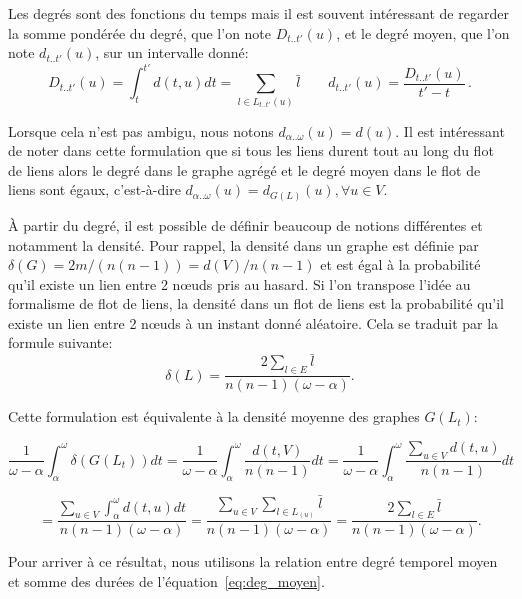 Les degrés sont des fonctions du temps mais il est souvent intéressant de regarder la somme pondérée du degré, que l'on note $D_{t..t'}(u)$, et le degré moyen, que l'on note $d_{t..t'}(u)$, sur un intervalle donné:
\begin{equation}
D_{t..t'}(u)= \int_{t}^{t'}d(t,u) dt  = \sum_{l \in L_{t..t'}(u)}\bar{l} \qquad
d_{t..t'}(u)= \dfrac{D_{t..t'}(u)}{t'-t}\, .
\label{eq:deg_moyen}
\end{equation}

Lorsque cela n'est pas ambigu, nous notons $d_{\alpha..\omega}(u) = d(u)$.
Il est intéressant de noter dans cette formulation que si tous les liens durent tout au long du flot de liens alors le degré dans le graphe agrégé et le degré moyen dans le flot de liens sont égaux, c'est-à-dire $d_{\alpha..\omega}(u) = d_{G(L)}(u), \forall u \in V$.

\`A partir du degré, il est possible de définir beaucoup de notions différentes et notamment la densité.
Pour rappel, la densité dans un graphe est définie par $\delta(G)=2m/(n(n-1))=d(V)/n(n-1)$ et est égal à la probabilité qu'il existe un lien entre 2 n\oe{}uds pris au hasard.
Si l'on transpose l'idée au formalisme de flot de liens, la densité dans un flot de liens est la probabilité qu'il existe un lien entre 2 n\oe{}uds à un instant donné aléatoire.
Cela se traduit par la formule suivante:
\begin{equation}
\delta(L)= \dfrac{2 \sum_{l \in E}\bar{l}}{n(n-1) (\omega-\alpha)}.
\end{equation}

Cette formulation est équivalente à la densité moyenne des graphes $G(L_t)$:

\begin{equation*}
\dfrac{1}{\omega-\alpha} \int_{\alpha}^{\omega} \delta(G(L_t)) dt=
\dfrac{1}{\omega-\alpha} \int_{\alpha}^{\omega} \dfrac{d(t,V)}{n(n-1)}dt=
 \dfrac{1}{\omega-\alpha} \int_{\alpha}^{\omega} \dfrac{\sum_{u \in V} d(t,u)}{n(n-1)}dt
 \end{equation*}

 \begin{equation*}
= \dfrac{\sum_{u \in V} \int_{\alpha}^{\omega}d(t,u)dt}{n(n-1)(\omega-\alpha)} =
\dfrac{\sum_{u \in V} \sum_{l \in L_(u)} \bar{l}}{n(n-1)(\omega-\alpha)} =
\dfrac{2\sum_{l \in E}\bar{l}}{n(n-1) (\omega-\alpha)} .
\end{equation*}

Pour arriver à ce résultat, nous utilisons la relation entre degré temporel moyen et somme des durées de l'équation~\ref{eq:deg_moyen}.

